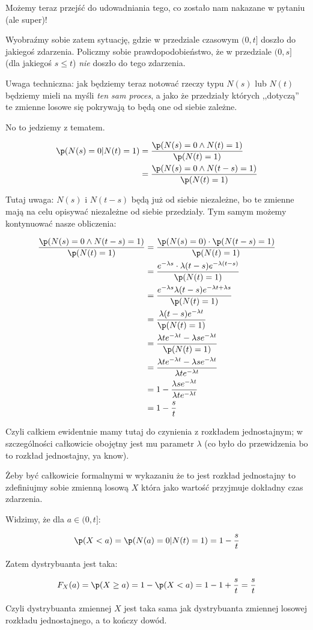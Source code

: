 Możemy teraz przejść do udowadniania tego, co zostało nam nakazane w pytaniu (ale super)! 

Wyobraźmy sobie zatem sytuację, gdzie w przedziale czasowym \((0, t]\) doszło do jakiegoś zdarzenia. Policzmy sobie prawdopodobieństwo, że w przedziale \((0, s]\) (dla jakiegoś \(s \leq t\)) \textit{nie} doszło do tego zdarzenia. 

Uwaga techniczna: jak będziemy teraz notować rzeczy typu \(N(s)\) lub \(N(t)\) będziemy mieli na myśli \textit{ten sam proces}, a jako że przedziały których ,,dotyczą'' te zmienne losowe się pokrywają to będą one od siebie zależne. 

No to jedziemy z tematem. 

\begin{align*}
    \p(N(s)=0 | N(t)=1) &= \frac{\p(N(s)=0 \land N(t)=1)}{\p(N(t)=1)}  \\
    &= \frac{\p(N(s)=0 \land N(t-s)=1)}{\p(N(t)=1)}
\end{align*}

Tutaj uwaga: \(N(s)\) i \(N(t-s)\) będą już od siebie niezależne, bo te zmienne mają na celu opisywać niezależne od siebie przedziały. Tym samym możemy kontynuować nasze obliczenia:

\begin{align*}
    \frac{\p(N(s)=0 \land N(t-s)=1)}{\p(N(t)=1)} &= \frac{\p(N(s)=0) \cdot \p(N(t-s)=1)}{\p(N(t)=1)}  \\
    &= \frac{e^{-\lambda s} \cdot \lambda (t-s) e^{-\lambda (t-s)}}{\p(N(t)=1)} \\ 
    &= \frac{e^{-\lambda s} \lambda (t-s) e^{-\lambda t + \lambda s}}{\p(N(t)=1)} \\ 
    &= \frac{\lambda (t-s) e^{-\lambda t}}{\p(N(t)=1)} \\
    &= \frac{\lambda t e^{-\lambda t} - \lambda s e^{-\lambda t}}{\p(N(t)=1)} \\ 
    &= \frac{\lambda t e^{-\lambda t} - \lambda s e^{-\lambda t}}{\lambda t e^{-\lambda t}} \\
    &= 1 - \frac{\lambda s e^{-\lambda t} }{\lambda t e^{-\lambda t}} \\ 
    &= 1 - \frac{s}{t}
\end{align*}

Czyli całkiem ewidentnie mamy tutaj do czynienia z rozkładem jednostajnym; w szczególności całkowicie obojętny jest mu parametr \(\lambda\) (co było do przewidzenia bo to rozkład jednostajny, ya know). 

Żeby być całkowicie formalnymi w wykazaniu że to jest rozkład jednostajny to zdefiniujmy sobie zmienną losową \(X\) która jako wartość przyjmuje dokładny czas zdarzenia. 

Widzimy, że dla \( a \in (0, t]\):

\[ 
    \p(X < a) = \p(N(a)=0 | N(t)=1) = 1 - \frac{s}{t}
\]

Zatem dystrybuanta jest taka:

\[
    F_X(a) = \p(X \geq a) = 1 - \p(X < a) = 1 - 1 + \frac{s}{t} = \frac{s}{t}
\]

Czyli dystrybuanta zmiennej \(X\) jest taka sama jak dystrybuanta zmiennej losowej rozkładu jednostajnego, a to kończy dowód. 